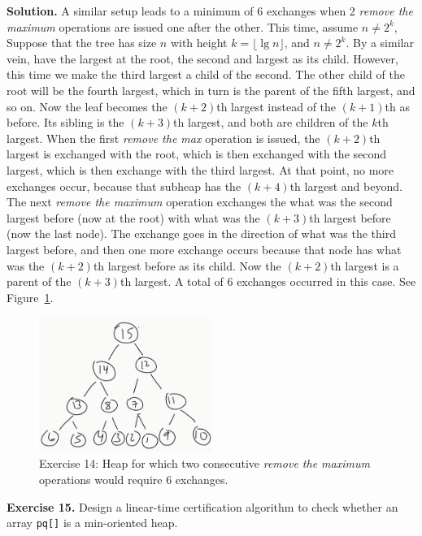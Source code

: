 \documentclass[12pt, a4paper]{article}
\newenvironment{ex}[2][Exercise]
{\par\medskip\noindent \textbf{#1 #2.}}
{\medskip}
\newenvironment{sol}[1][Solution]
{\par\medskip\noindent \textbf{#1.} }
{\medskip}
\begin{document}
\begin{sol}
		A similar setup leads to a minimum of 6 exchanges when 2 \emph{remove the maximum}
		operations are issued one after the other. This time, assume $n\neq 2^k$,
		Suppose that the tree has size $n$ with height $k=\lfloor \lg n\rfloor$,
		and $n\neq 2^k$. By a similar vein, have the largest at the root, the second
		and largest as its child. However, this time we make the third largest
		a child of the second. The other child of the root will be the fourth
		largest, which in turn is the parent of the fifth largest, and so on.
		Now the leaf becomes the $(k+2)$th largest instead of the $(k+1)$th as before.
		Its sibling is the $(k+3)$th largest, and both are children of the $k$th
		largest. When the first \emph{remove the max} operation is issued, the
		$(k+2)$th largest is exchanged with the root, which is then exchanged
		with the second largest, which is then exchange with the third largest.
		At that point, no more exchanges occur, because that subheap has
		the $(k+4)$th largest and beyond. The next \emph{remove the maximum}
		operation exchanges the what was the second largest before (now at the root)
		with what was the $(k+3)$th largest before (now the last node).
		The exchange goes in the direction of what was the third largest before,
		and then one more exchange occurs because that node has what was the $(k+2)$th
		largest before as its child. Now the $(k+2)$th largest is a parent
		of the $(k+3)$th largest. A total of 6 exchanges occurred in this case.
		See Figure~\ref{fig:ex-14-remove-max-twice}.
		\begin{figure}
			\centering
			\includegraphics[width=0.5\textwidth]{exercise-14-remove-max-twice}
			\caption{Exercise 14: Heap for which two consecutive \emph{remove the maximum} operations
				would require 6 exchanges.}
			\label{fig:ex-14-remove-max-twice}
		\end{figure}
	\end{sol}
	\begin{ex}{15}
		Design a linear-time certification algorithm to check whether an array \texttt{pq[]}
		is a min-oriented heap.
	\end{ex}
\end{document}

